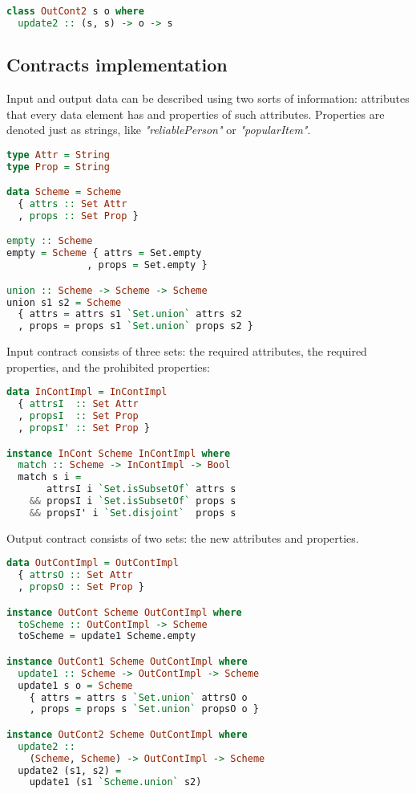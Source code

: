 \begin{lstlisting}[language=Haskell]
class OutCont2 s o where
  update2 :: (s, s) -> o -> s
\end{lstlisting}

\subsection{Contracts implementation}

Input and output data can be described using two sorts of information: attributes that every data element has and properties of such attributes.
Properties are denoted just as strings, like {\em "reliablePerson"} or {\em "popularItem"}.

\begin{lstlisting}[language=Haskell]
type Attr = String
type Prop = String

data Scheme = Scheme
  { attrs :: Set Attr
  , props :: Set Prop }

empty :: Scheme
empty = Scheme { attrs = Set.empty
              , props = Set.empty }

union :: Scheme -> Scheme -> Scheme
union s1 s2 = Scheme
  { attrs = attrs s1 `Set.union` attrs s2
  , props = props s1 `Set.union` props s2 }
\end{lstlisting}

Input contract consists of three sets: the required attributes, the required properties, and the prohibited properties:

\begin{lstlisting}[language=Haskell]
data InContImpl = InContImpl
  { attrsI  :: Set Attr
  , propsI  :: Set Prop
  , propsI' :: Set Prop }

instance InCont Scheme InContImpl where
  match :: Scheme -> InContImpl -> Bool
  match s i =
       attrsI i `Set.isSubsetOf` attrs s
    && propsI i `Set.isSubsetOf` props s
    && propsI' i `Set.disjoint`  props s
\end{lstlisting}

Output contract consists of two sets: the new attributes and properties.

\begin{lstlisting}[language=Haskell]
data OutContImpl = OutContImpl
  { attrsO :: Set Attr
  , propsO :: Set Prop }

instance OutCont Scheme OutContImpl where
  toScheme :: OutContImpl -> Scheme
  toScheme = update1 Scheme.empty

instance OutCont1 Scheme OutContImpl where
  update1 :: Scheme -> OutContImpl -> Scheme
  update1 s o = Scheme
    { attrs = attrs s `Set.union` attrsO o
    , props = props s `Set.union` propsO o }

instance OutCont2 Scheme OutContImpl where
  update2 :: 
    (Scheme, Scheme) -> OutContImpl -> Scheme
  update2 (s1, s2) = 
    update1 (s1 `Scheme.union` s2)
\end{lstlisting}

